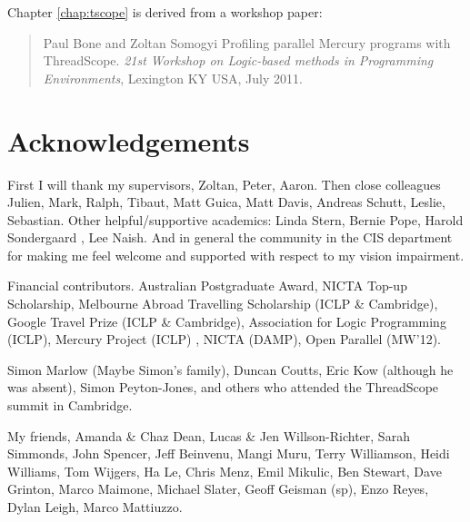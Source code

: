 \documentclass[a4paper,twoside]{report}
\begin{document}

Chapter \ref{chap:tscope} is derived from a workshop paper:

\begin{quote}
Paul Bone and Zoltan Somogyi
Profiling parallel Mercury programs with ThreadScope.
{\em 21st Workshop on Logic-based methods in Programming Environments},
Lexington KY USA, July 2011.
\end{quote}


\chapter*{Acknowledgements}


First I will thank my supervisors,
Zoltan,
Peter,
Aaron.
Then close colleagues
Julien, 
Mark, 
Ralph, 
Tibaut,
Matt Guica,
Matt Davis,
Andreas Schutt,
Leslie,
Sebastian.
Other helpful/supportive academics:
Linda Stern,
Bernie Pope,
Harold Sondergaard ,
Lee Naish.
And in general the community in the CIS department for making me feel
welcome and supported with respect to my vision impairment.

Financial contributors.
Australian Postgraduate Award,
NICTA Top-up Scholarship,
Melbourne Abroad Travelling Scholarship (ICLP \& Cambridge),
Google Travel Prize (ICLP \& Cambridge),
Association for Logic Programming (ICLP),
Mercury Project (ICLP) ,
NICTA (DAMP),
Open Parallel (MW'12).

Simon Marlow (Maybe Simon's family),
Duncan Coutts,
Eric Kow (although he was absent),
Simon Peyton-Jones,
and others who attended the ThreadScope summit in Cambridge.

My friends,
Amanda \& Chaz Dean,
Lucas \& Jen Willson-Richter,
Sarah Simmonds, John Spencer,
Jeff Beinvenu, Mangi Muru, 
Terry Williamson, Heidi Williams,
Tom Wijgers,
Ha Le,
Chris Menz,
Emil Mikulic,
Ben Stewart,
Dave Grinton,
Marco Maimone,
Michael Slater,
Geoff Geisman (sp),
Enzo Reyes,
Dylan Leigh,
Marco Mattiuzzo.
\end{document}

